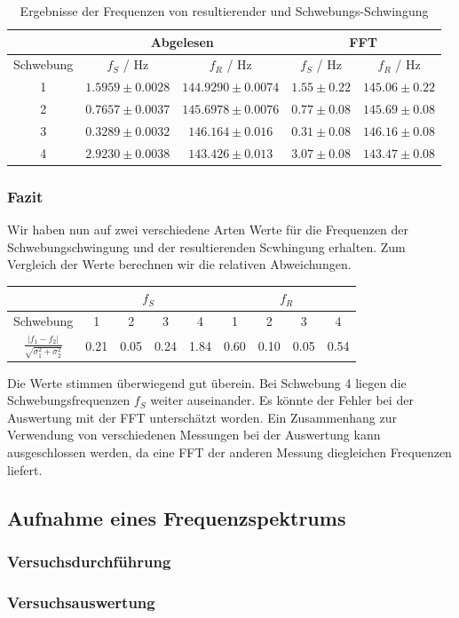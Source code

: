 \begin{table}[H]
\centering
\begin{tabular}{c|c|c|c|c}
& \multicolumn{2}{c|}{Abgelesen} & \multicolumn{2}{c}{FFT} \\
\hline
Schwebung & $f_S$ / Hz & $f_R$ / Hz & $f_S$ / Hz & $f_R$ / Hz \\
\hline
1 & $ 1.5959 \pm 0.0028$ & $ 144.9290 \pm 0.0074$ & $ 1.55 \pm 0.22$ & $ 145.06 \pm 0.22$ \\
2 & $ 0.7657 \pm 0.0037$ & $ 145.6978 \pm 0.0076$ & $ 0.77 \pm 0.08$ & $ 145.69 \pm 0.08$ \\
3 & $ 0.3289 \pm 0.0032$ & $ 146.164 \pm 0.016$ & $ 0.31 \pm 0.08$ & $ 146.16 \pm 0.08$ \\
4 & $ 2.9230 \pm 0.0038$ & $ 143.426 \pm 0.013$ & $ 3.07 \pm 0.08$ & $ 143.47 \pm 0.08$ 
\end{tabular}
\caption{Ergebnisse der Frequenzen von resultierender und Schwebungs-Schwingung}
\label{tabFreqErg}
\end{table}



\subsubsection{Fazit}

Wir haben nun auf zwei verschiedene Arten Werte für die Frequenzen der Schwebungschwingung und der resultierenden Scwhingung erhalten. Zum Vergleich der Werte berechnen wir die relativen Abweichungen.

\begin{table}[H]
\centering
\begin{tabular}{c|c|c|c|c|c|c|c|c}
& \multicolumn{4}{c|}{$f_S$} & \multicolumn{4}{c}{$f_R$} \\
\hline
Schwebung & 1 & 2 & 3 & 4 & 1 & 2 & 3 & 4 \\
\hline
$\frac{|f_1-f_2|}{\sqrt{\sigma_1^2+\sigma_2^2}}$ & 0.21 & 0.05 & 0.24 & 1.84 & 0.60 & 0.10 & 0.05 & 0.54 
\end{tabular}
\end{table}
Die Werte stimmen überwiegend gut überein. Bei Schwebung 4 liegen die Schwebungsfrequenzen $f_S$ weiter auseinander. Es könnte der Fehler bei der Auswertung mit der FFT unterschätzt worden. Ein Zusammenhang zur Verwendung von verschiedenen Messungen bei der Auswertung kann ausgeschlossen werden, da eine FFT der anderen Messung diegleichen Frequenzen liefert.  


\subsection{Aufnahme eines Frequenzspektrums}

\subsubsection{Versuchsdurchführung}


\subsubsection{Versuchsauswertung}

